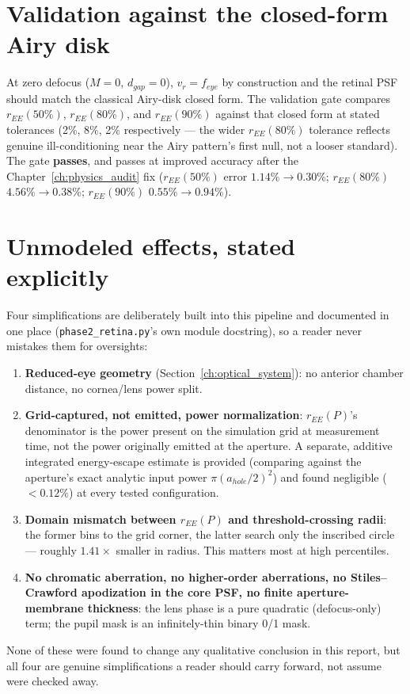 \section{Validation against the closed-form Airy disk}

At zero defocus ($M=0$, $d_{gap}=0$), $v_r=f_{eye}$ by construction and the retinal
PSF should match the classical Airy-disk closed form. The validation gate compares
$r_{EE}(50\%)$, $r_{EE}(80\%)$, and $r_{EE}(90\%)$ against that closed form at stated
tolerances (2\%, 8\%, 2\% respectively --- the wider $r_{EE}(80\%)$ tolerance reflects
genuine ill-conditioning near the Airy pattern's first null, not a looser standard).
The gate \textbf{passes}, and passes at improved accuracy after the Chapter~\ref{ch:physics_audit}
fix ($r_{EE}(50\%)$ error $1.14\%\to0.30\%$; $r_{EE}(80\%)$ $4.56\%\to0.38\%$;
$r_{EE}(90\%)$ $0.55\%\to0.94\%$).

\section{Unmodeled effects, stated explicitly}
\label{sec:unmodeled}

Four simplifications are deliberately built into this pipeline and documented in one
place (\texttt{phase2\_retina.py}'s own module docstring), so a reader never mistakes
them for oversights:

\begin{enumerate}[label=(E\arabic*)]
\item \textbf{Reduced-eye geometry} (Section~\ref{ch:optical_system}): no anterior
  chamber distance, no cornea/lens power split.
\item \textbf{Grid-captured, not emitted, power normalization}: $r_{EE}(P)$'s
  denominator is the power present on the simulation grid at measurement time, not the
  power originally emitted at the aperture. A separate, additive integrated
  energy-escape estimate is provided (comparing against the aperture's exact analytic
  input power $\pi(a_{hole}/2)^2$) and found negligible ($<0.12\%$) at every tested
  configuration.
\item \textbf{Domain mismatch between $r_{EE}(P)$ and threshold-crossing radii}: the
  former bins to the grid corner, the latter search only the inscribed circle ---
  roughly $1.41\times$ smaller in radius. This matters most at high percentiles.
\item \textbf{No chromatic aberration, no higher-order aberrations, no
  Stiles--Crawford apodization in the core PSF, no finite aperture-membrane
  thickness}: the lens phase is a pure quadratic (defocus-only) term; the pupil mask
  is an infinitely-thin binary 0/1 mask.
\end{enumerate}

None of these were found to change any qualitative conclusion in this report, but all
four are genuine simplifications a reader should carry forward, not assume were
checked away.
